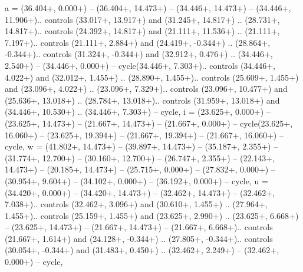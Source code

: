 {a} = {(36.404+\ctpXshift, 0.000+\ctpYshift) -- (36.404+\ctpXshift, 14.473+\ctpYshift) -- (34.446+\ctpXshift, 14.473+\ctpYshift) -- (34.446+\ctpXshift, 11.906+\ctpYshift).. controls (33.017+\ctpXshift, 13.917+\ctpYshift) and (31.245+\ctpXshift, 14.817+\ctpYshift) .. (28.731+\ctpXshift, 14.817+\ctpYshift).. controls (24.392+\ctpXshift, 14.817+\ctpYshift) and (21.111+\ctpXshift, 11.536+\ctpYshift) .. (21.111+\ctpXshift, 7.197+\ctpYshift).. controls (21.111+\ctpXshift, 2.884+\ctpYshift) and (24.419+\ctpXshift, -0.344+\ctpYshift) .. (28.864+\ctpXshift, -0.344+\ctpYshift).. controls (31.324+\ctpXshift, -0.344+\ctpYshift) and (32.912+\ctpXshift, 0.476+\ctpYshift) .. (34.446+\ctpXshift, 2.540+\ctpYshift) -- (34.446+\ctpXshift, 0.000+\ctpYshift) -- cycle(34.446+\ctpXshift, 7.303+\ctpYshift).. controls (34.446+\ctpXshift, 4.022+\ctpYshift) and (32.012+\ctpXshift, 1.455+\ctpYshift) .. (28.890+\ctpXshift, 1.455+\ctpYshift).. controls (25.609+\ctpXshift, 1.455+\ctpYshift) and (23.096+\ctpXshift, 4.022+\ctpYshift) .. (23.096+\ctpXshift, 7.329+\ctpYshift).. controls (23.096+\ctpXshift, 10.477+\ctpYshift) and (25.636+\ctpXshift, 13.018+\ctpYshift) .. (28.784+\ctpXshift, 13.018+\ctpYshift).. controls (31.959+\ctpXshift, 13.018+\ctpYshift) and (34.446+\ctpXshift, 10.530+\ctpYshift) .. (34.446+\ctpXshift, 7.303+\ctpYshift) -- cycle},
{i} = {(23.625+\ctpXshift, 0.000+\ctpYshift) -- (23.625+\ctpXshift, 14.473+\ctpYshift) -- (21.667+\ctpXshift, 14.473+\ctpYshift) -- (21.667+\ctpXshift, 0.000+\ctpYshift) -- cycle(23.625+\ctpXshift, 16.060+\ctpYshift) -- (23.625+\ctpXshift, 19.394+\ctpYshift) -- (21.667+\ctpXshift, 19.394+\ctpYshift) -- (21.667+\ctpXshift, 16.060+\ctpYshift) -- cycle},
{w} = {(41.802+\ctpXshift, 14.473+\ctpYshift) -- (39.897+\ctpXshift, 14.473+\ctpYshift) -- (35.187+\ctpXshift, 2.355+\ctpYshift) -- (31.774+\ctpXshift, 12.700+\ctpYshift) -- (30.160+\ctpXshift, 12.700+\ctpYshift) -- (26.747+\ctpXshift, 2.355+\ctpYshift) -- (22.143+\ctpXshift, 14.473+\ctpYshift) -- (20.185+\ctpXshift, 14.473+\ctpYshift) -- (25.715+\ctpXshift, 0.000+\ctpYshift) -- (27.832+\ctpXshift, 0.000+\ctpYshift) -- (30.954+\ctpXshift, 9.604+\ctpYshift) -- (34.102+\ctpXshift, 0.000+\ctpYshift) -- (36.192+\ctpXshift, 0.000+\ctpYshift) -- cycle},
{u} = {(34.420+\ctpXshift, 0.000+\ctpYshift) -- (34.420+\ctpXshift, 14.473+\ctpYshift) -- (32.462+\ctpXshift, 14.473+\ctpYshift) -- (32.462+\ctpXshift, 7.038+\ctpYshift).. controls (32.462+\ctpXshift, 3.096+\ctpYshift) and (30.610+\ctpXshift, 1.455+\ctpYshift) .. (27.964+\ctpXshift, 1.455+\ctpYshift).. controls (25.159+\ctpXshift, 1.455+\ctpYshift) and (23.625+\ctpXshift, 2.990+\ctpYshift) .. (23.625+\ctpXshift, 6.668+\ctpYshift) -- (23.625+\ctpXshift, 14.473+\ctpYshift) -- (21.667+\ctpXshift, 14.473+\ctpYshift) -- (21.667+\ctpXshift, 6.668+\ctpYshift).. controls (21.667+\ctpXshift, 1.614+\ctpYshift) and (24.128+\ctpXshift, -0.344+\ctpYshift) .. (27.805+\ctpXshift, -0.344+\ctpYshift).. controls (30.054+\ctpXshift, -0.344+\ctpYshift) and (31.483+\ctpXshift, 0.450+\ctpYshift) .. (32.462+\ctpXshift, 2.249+\ctpYshift) -- (32.462+\ctpXshift, 0.000+\ctpYshift) -- cycle},
